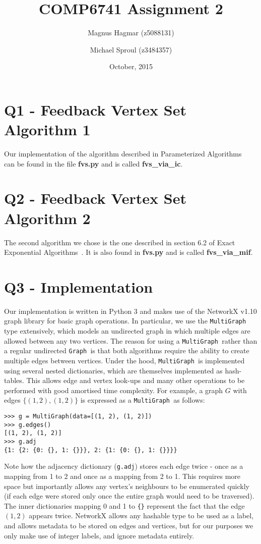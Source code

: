 \documentclass[a4paper,12pt]{article}
\title{COMP6741 Assignment 2}
\author{Magnus Hagmar (z5088131)
    \and
    Michael Sproul (z3484357)}
\date{October, 2015}
\newcommand{\MultiGraph}{\texttt{MultiGraph }}
\newcommand{\Graph}{\texttt{Graph }}
\begin{document}
\maketitle
{}

\section{Q1 - Feedback Vertex Set Algorithm 1}
Our implementation of the algorithm described in Parameterized Algorithms~\cite{parameterized} can be found in the file \textbf{fvs.py} and is called \textbf{fvs\_via\_ic}.

\section{Q2 - Feedback Vertex Set Algorithm 2}
The second algorithm we chose is the one described in section 6.2 of Exact Exponential Algorithms~\cite{exactexp}. It is also found in \textbf{fvs.py} and is called \textbf{fvs\_via\_mif}.

\section{Q3 - Implementation}

Our implementation is written in Python 3 and makes use of the NetworkX v1.10 \cite{networkx} graph library for basic graph operations. In particular, we use the \MultiGraph type extensively, which models an undirected graph in which multiple edges are allowed between any two vertices. The reason for using a \MultiGraph rather than a regular undirected \Graph is that both algorithms require the ability to create multiple edges between vertices. Under the hood, \MultiGraph is implemented using several nested dictionaries, which are themselves implemented as hash-tables. This allows edge and vertex look-ups and many other operations to be performed with good amortised time complexity. For example, a graph $G$ with edges $\{(1, 2), (1, 2)\}$ is expressed as a \MultiGraph as follows:

\begin{verbatim}
>>> g = MultiGraph(data=[(1, 2), (1, 2)])
>>> g.edges()
[(1, 2), (1, 2)]
>>> g.adj
{1: {2: {0: {}, 1: {}}}, 2: {1: {0: {}, 1: {}}}}
\end{verbatim}

Note how the adjacency dictionary (\texttt{g.adj}) stores each edge twice - once as a mapping from 1 to 2 and once as a mapping from 2 to 1. This requires more space but importantly allows any vertex's neighbours to be enumerated quickly (if each edge were stored only once the entire graph would need to be traversed). The inner dictionaries mapping 0 and 1 to \texttt{\{\}} represent the fact that the edge $(1, 2)$ appears twice. NetworkX allows any hashable type to be used as a label, and allows metadata to be stored on edges and vertices, but for our purposes we only make use of integer labels, and ignore metadata entirely.
\end{document}
